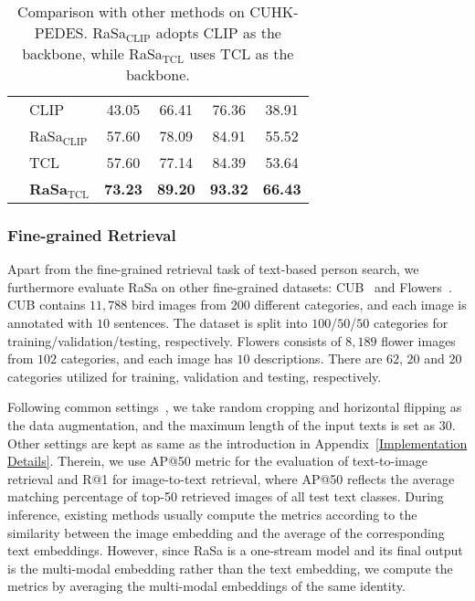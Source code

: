 \documentclass{article}
\begin{document}
\begin{table}[t]
\begin{tabular}{c|l|cccc}
\cline{2-6}
                                               & CLIP~\cite{radford2021learning}     & 43.05 & 66.41 & 76.36 & 38.91  \\
                                               & RaSa$_\text{CLIP}$                   & 57.60 & 78.09 & 84.91 & 55.52  \\
                                               & TCL~\cite{yang2022vision}           & 57.60 & 77.14 & 84.39 & 53.64  \\
                                               & \textbf{RaSa$_\text{TCL}$}   & \textbf{73.23} & \textbf{89.20} & \textbf{93.32} & \textbf{66.43}  \\
\hline
\end{tabular}
\caption{Comparison with other methods on CUHK-PEDES. RaSa$_\text{CLIP}$ adopts CLIP as the backbone, while RaSa$_\text{TCL}$ uses TCL as the backbone.}
\label{table8}
\end{table}

\subsubsection{Fine-grained Retrieval}
Apart from the fine-grained retrieval task of text-based person search, we furthermore evaluate RaSa on other fine-grained datasets: CUB~\cite{reed2016learning} and Flowers~\cite{reed2016learning}.
CUB contains $11,788$ bird images from $200$ different categories, and each image is annotated with $10$ sentences. The dataset is split into $100$/$50$/$50$ categories for training/validation/testing, respectively.
Flowers consists of $8,189$ flower images from $102$ categories, and each image has $10$ descriptions. There are $62$, $20$ and $20$ categories utilized for training, validation and testing, respectively.

Following common settings~\cite{reed2016learning,sarafianos2019adversarial}, we take random cropping and horizontal flipping as the data augmentation, and the maximum length of the input texts is set as $30$.
Other settings are kept as same as the introduction in Appendix~\ref{Implementation Details}.
Therein, we use AP@50 metric for the evaluation of text-to-image retrieval and R@1 for image-to-text retrieval, where AP@50 reflects the average matching percentage of top-50 retrieved images of all test text classes.
During inference, existing methods usually compute the metrics according to the similarity between the image embedding and the average of the corresponding text embeddings.
However, since RaSa is a one-stream model and its final output is the multi-modal embedding rather than the text embedding, we compute the metrics by averaging the multi-modal embeddings of the same identity.
\end{document}
